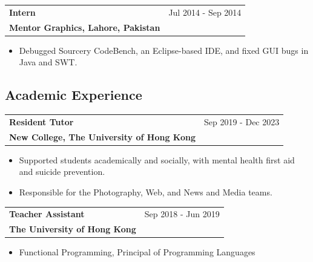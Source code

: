 \noindent\begin{minipage}{\linewidth}
\begin{tabularx}{\linewidth}{@{}X r@{}}
    \textbf{Intern} & Jul 2014 - Sep 2014 \\[3.75pt]
    \textbf{Mentor Graphics, Lahore, Pakistan} &
\end{tabularx}
\vspace{\glueexpr -\parskip + 2pt\relax}
\begin{itemize}[nosep,after=\strut, leftmargin=1em, itemsep=3pt]
    \item[--] Debugged Sourcery CodeBench, an Eclipse-based IDE, and fixed GUI bugs in Java and SWT.
\end{itemize}
\end{minipage}

\subsection{Academic Experience}

\begin{tabularx}{\linewidth}{@{}X r@{}}
    \textbf{Resident Tutor} & Sep 2019 - Dec 2023 \\[3.75pt]
    \textbf{New College, The University of Hong Kong} &
\end{tabularx}\nopagebreak
\vspace{\glueexpr -\parskip + 2pt\relax}
\begin{itemize}[nosep,after=\strut, leftmargin=1em, itemsep=3pt]
    \item[--] Supported students academically and socially, with mental health first aid and suicide prevention.
    \item[--] Responsible for the Photography, Web, and News and Media teams.
\end{itemize}

\begin{tabularx}{\linewidth}{@{}X r@{}}
    \textbf{Teacher Assistant} & Sep 2018 - Jun 2019 \\[3.75pt]
    \textbf{The University of Hong Kong} &
\end{tabularx}\nopagebreak
\vspace{\glueexpr -\parskip + 2pt\relax}
\begin{itemize}[nosep,after=\strut, leftmargin=1em, itemsep=3pt]
    \item[--] Functional Programming, Principal of Programming Languages
\end{itemize}

